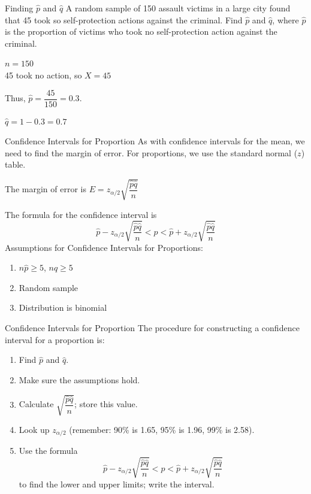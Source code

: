 \documentclass[t, aspectratio=169]{beamer}
\newcommand{\?}{\stackrel{?}{=}}
\begin{document}
	\begin{frame}{Finding $\hat{p}$ and $\hat{q}$}
		A random sample of 150 assault victims in a large city found that 45 took so self-protection actions against the criminal. Find $\hat{p}$ and $\hat{q}$, where $\hat{p}$ is the proportion of victims who took no self-protection action against the criminal. \pause
		
		$n = 150$ \pause \\
		45 took no action, so $X = 45$ \pause
		
		Thus, $\hat{p} = \dfrac{45}{150} = 0.3$. \pause
		
		$\hat{q} = 1 - 0.3 = 0.7$
	\end{frame}

	\begin{frame}{Confidence Intervals for Proportion}
		As with confidence intervals for the mean, we need to find the margin of error. For proportions, we use the standard normal ($z$) table. \pause
		
		The margin of error is $E = z_{\alpha / 2}\sqrt{\dfrac{\hat{p}\hat{q}}{n}}$ \pause
		
		The formula for the confidence interval is $$\hat{p} - z_{\alpha / 2}\sqrt{\dfrac{\hat{p}\hat{q}}{n}} < p < \hat{p} + z_{\alpha / 2}\sqrt{\dfrac{\hat{p}\hat{q}}{n}}$$ \pause
		Assumptions for Confidence Intervals for Proportions: \begin{enumerate}[1)]
			\item $n\hat{p} \geq 5$, $n\hat{q} \geq 5$ \pause
			\item Random sample
			\item Distribution is binomial
		\end{enumerate}
	\end{frame}

	\begin{frame}{Confidence Intervals for Proportion}
		The procedure for constructing a confidence interval for a proportion is: \begin{enumerate}[1)]
			\item Find $\hat{p}$ and $\hat{q}$. \pause
			\item Make sure the assumptions hold. \pause
			\item Calculate $\sqrt{\dfrac{\hat{p}\hat{q}}{n}}$; store this value. \pause
			\item Look up $z_{\alpha / 2}$ (remember: 90\% is 1.65, 95\% is 1.96, 99\% is 2.58). \pause
			\item Use the formula $$\hat{p} - z_{\alpha / 2}\sqrt{\dfrac{\hat{p}\hat{q}}{n}} < p < \hat{p} + z_{\alpha / 2}\sqrt{\dfrac{\hat{p}\hat{q}}{n}}$$ to find the lower and upper limits; write the interval.
		\end{enumerate}
	\end{frame}
\end{document}
